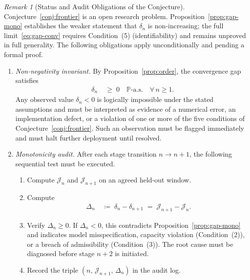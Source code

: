 \documentclass[12pt,openany]{book}
\numberwithin{equation}{chapter}
\theoremstyle{plain}
\theoremstyle{definition}
\theoremstyle{remark}
\newtheorem{remark}[theorem]{Remark}
\numberwithin{equation}{chapter}
\theoremstyle{plain}
\begin{document}
\begin{remark}[Status and Audit Obligations of the Conjecture]
\label{rem:conjecture-status}
Conjecture~\ref{conj:frontier} is an open research problem.
Proposition~\ref{prop:gap-mono} establishes the weaker
statement that $\delta_n$ is non-increasing; the full
limit~\eqref{eq:gap-conv} requires Condition~(5)
(identifiability) and remains unproved in full generality.
The following obligations apply unconditionally and
pending a formal proof.

\begin{enumerate}
  \item \emph{Non-negativity invariant.}
        By Proposition~\ref{prop:order}, the convergence gap
        satisfies
        \begin{align}
          \delta_n
          &\;\geq\; 0
          \quad \mathbb{P}\text{-a.s.}
          \quad \forall\, n \geq 1.
          \label{eq:gap-nonneg}
        \end{align}
        Any observed value $\delta_n < 0$ is logically
        impossible under the stated assumptions and must
        be interpreted as evidence of a numerical error,
        an implementation defect, or a violation of one
        or more of the five conditions of
        Conjecture~\ref{conj:frontier}.
        Such an observation must be flagged immediately
        and must halt further deployment until resolved.

  \item \emph{Monotonicity audit.}
        After each stage transition $n \to n+1$, the
        following sequential test must be executed.
        \begin{enumerate}
          \item Compute $\mathcal{J}_n$ and
                $\mathcal{J}_{n+1}$ on an agreed
                held-out window.
          \item Compute
                \begin{align}
                  \Delta_n
                  &\;\coloneqq\;
                  \delta_n - \delta_{n+1}
                  \;=\;
                  \mathcal{J}_{n+1} - \mathcal{J}_n.
                  \label{eq:Delta-n}
                \end{align}
          \item Verify $\Delta_n \geq 0$.
                If $\Delta_n < 0$, this contradicts
                Proposition~\ref{prop:gap-mono} and
                indicates model misspecification,
                capacity violation (Condition~(2)),
                or a breach of admissibility
                (Condition~(3)).
                The root cause must be diagnosed
                before stage $n+2$ is initiated.
          \item Record the triple
                $(n,\,\mathcal{J}_{n+1},\,\Delta_n)$
                in the audit log.
        \end{enumerate}


\end{enumerate}
\end{remark}
\end{document}
